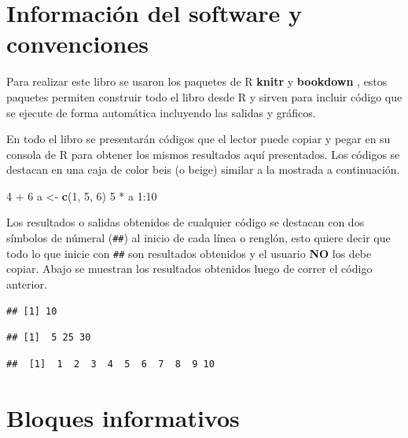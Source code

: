 \documentclass[10pt,]{krantz}
\makeatletter
\newenvironment{Shaded}{\begin{snugshade}}{\end{snugshade}}
\newcommand{\KeywordTok}[1]{\textcolor[rgb]{0.13,0.29,0.53}{\textbf{{#1}}}}
\newcommand{\DecValTok}[1]{\textcolor[rgb]{0.00,0.00,0.81}{{#1}}}
\newcommand{\StringTok}[1]{\textcolor[rgb]{0.31,0.60,0.02}{{#1}}}
\newcommand{\NormalTok}[1]{{#1}}
\let\proglang=\textsf
\newenvironment{kframe}{%
\medskip{}
\setlength{\fboxsep}{.8em}
 \def\at@end@of@kframe{}%
 \ifinner\ifhmode%
  \def\at@end@of@kframe{\end{minipage}}%
  \begin{minipage}{\columnwidth}%
 \fi\fi%
 \def\FrameCommand##1{\hskip\@totalleftmargin \hskip-\fboxsep
 \colorbox{shadecolor}{##1}\hskip-\fboxsep
     \hskip-\linewidth \hskip-\@totalleftmargin \hskip\columnwidth}%
 \MakeFramed {\advance\hsize-\width
   \@totalleftmargin\z@ \linewidth\hsize
   \@setminipage}}%
 {\par\unskip\endMakeFramed%
 \at@end@of@kframe}
\renewenvironment{Shaded}{\begin{kframe}}{\end{kframe}}
\makeatother
\begin{document}
\section*{Información del software y
convenciones}\label{informacion-del-software-y-convenciones}


Para realizar este libro se usaron los paquetes de \proglang{R}
\textbf{knitr} \citep{xie2015} y
\textbf{bookdown} \citep{R-bookdown}, estos paquetes
permiten construir todo el libro desde \proglang{R} y sirven para
incluir código que se ejecute de forma automática incluyendo las salidas
y gráficos.

En todo el libro se presentarán códigos que el lector puede copiar y
pegar en su consola de \proglang{R} para obtener los mismos resultados
aquí presentados. Los códigos se destacan en una caja de color beis (o
beige) similar a la mostrada a continuación.

\begin{Shaded}
\begin{Highlighting}[]
\DecValTok{4} \NormalTok{+}\StringTok{ }\DecValTok{6}
\NormalTok{a <-}\StringTok{ }\KeywordTok{c}\NormalTok{(}\DecValTok{1}\NormalTok{, }\DecValTok{5}\NormalTok{, }\DecValTok{6}\NormalTok{)}
\DecValTok{5} \NormalTok{*}\StringTok{ }\NormalTok{a}
\DecValTok{1}\NormalTok{:}\DecValTok{10}
\end{Highlighting}
\end{Shaded}

Los resultados o salidas obtenidos de cualquier código se destacan con
dos símbolos de númeral (\texttt{\#\#}) al inicio de cada línea o
renglón, esto quiere decir que todo lo que inicie con \texttt{\#\#} son
resultados obtenidos y el usuario \textbf{NO} los debe copiar. Abajo se
muestran los resultados obtenidos luego de correr el código anterior.

\begin{verbatim}
## [1] 10
\end{verbatim}

\begin{verbatim}
## [1]  5 25 30
\end{verbatim}

\begin{verbatim}
##  [1]  1  2  3  4  5  6  7  8  9 10
\end{verbatim}

\section*{Bloques informativos}\label{bloques-informativos}
\end{document}
